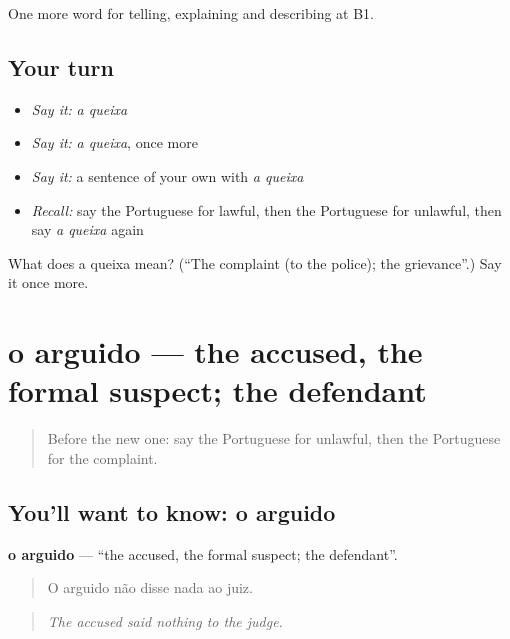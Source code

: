 \begin{grammarlens}[title={What you've built}]
One more word for telling, explaining and describing at B1.
\end{grammarlens}

\subsection*{Your turn}
\begin{itemize}
\raggedright
  \item \emph{Say it:} \emph{a queixa}
  \item \emph{Say it:} \emph{a queixa}, once more
  \item \emph{Say it:} a sentence of your own with \emph{a queixa}
  \item \emph{Recall:} say the Portuguese for lawful, then the Portuguese for unlawful, then say \emph{a queixa} again
\end{itemize}

\begin{tcolorbox}[breakable,colback=teal!4,colframe=teal!35!black,title={Before you move on}]
What does a queixa mean? (\textquotedblleft{}The complaint (to the police); the grievance\textquotedblright{}.) Say it once more.
\end{tcolorbox}
\section[o arguido]{o arguido — the accused, the formal suspect; the defendant}

\label{lesson:PT-C387-arguido}



\begin{quote}
Before the new one: say the Portuguese for unlawful, then the Portuguese for the complaint.
\end{quote}

\subsection*{You'll want to know: o arguido}
\textbf{o arguido} — \textquotedblleft{}the accused, the formal suspect; the defendant\textquotedblright{}.

\begin{quote}
O arguido não disse nada ao juiz.
\end{quote}

\begin{quote}
\emph{The accused said nothing to the judge.}
\end{quote}

